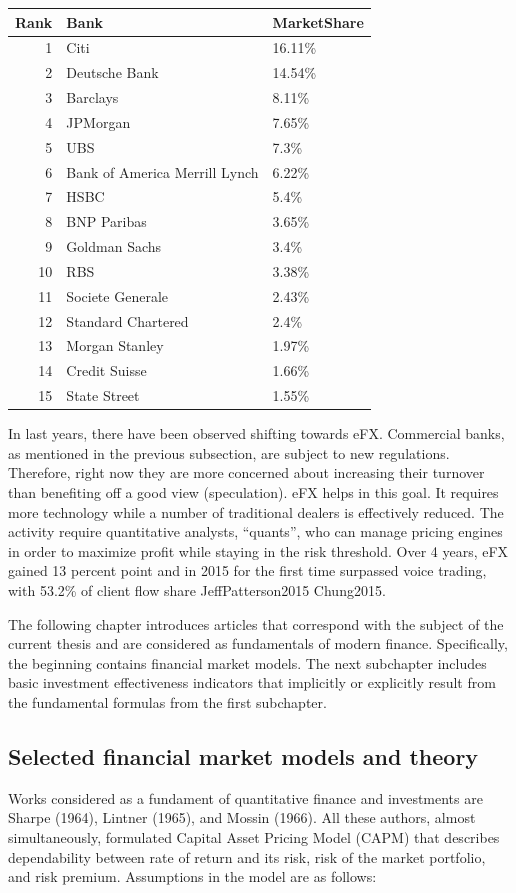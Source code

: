 \documentclass[]{article}
\begin{document}
\begin{longtable}[]{@{}rll@{}}
\toprule
Rank & Bank & MarketShare\tabularnewline
\midrule
\endhead
1 & Citi & 16.11\%\tabularnewline
2 & Deutsche Bank & 14.54\%\tabularnewline
3 & Barclays & 8.11\%\tabularnewline
4 & JPMorgan & 7.65\%\tabularnewline
5 & UBS & 7.3\%\tabularnewline
6 & Bank of America Merrill Lynch & 6.22\%\tabularnewline
7 & HSBC & 5.4\%\tabularnewline
8 & BNP Paribas & 3.65\%\tabularnewline
9 & Goldman Sachs & 3.4\%\tabularnewline
10 & RBS & 3.38\%\tabularnewline
11 & Societe Generale & 2.43\%\tabularnewline
12 & Standard Chartered & 2.4\%\tabularnewline
13 & Morgan Stanley & 1.97\%\tabularnewline
14 & Credit Suisse & 1.66\%\tabularnewline
15 & State Street & 1.55\%\tabularnewline
\bottomrule
\end{longtable}

In last years, there have been observed shifting towards eFX. Commercial
banks, as mentioned in the previous subsection, are subject to new
regulations. Therefore, right now they are more concerned about
increasing their turnover than benefiting off a good view (speculation).
eFX helps in this goal. It requires more technology while a number of
traditional dealers is effectively reduced. The activity require
quantitative analysts, ``quants'', who can manage pricing engines in
order to maximize profit while staying in the risk threshold. Over 4
years, eFX gained 13 percent point and in 2015 for the first time
surpassed voice trading, with 53.2\% of client flow share
JeffPatterson2015 Chung2015.

The following chapter introduces articles that correspond with the
subject of the current thesis and are considered as fundamentals of
modern finance. Specifically, the beginning contains financial market
models. The next subchapter includes basic investment effectiveness
indicators that implicitly or explicitly result from the fundamental
formulas from the first subchapter.

\subsection{Selected financial market models and
theory}\label{selected-financial-market-models-and-theory}

Works considered as a fundament of quantitative finance and investments
are Sharpe (1964), Lintner (1965), and Mossin (1966). All these authors,
almost simultaneously, formulated Capital Asset Pricing Model (CAPM)
that describes dependability between rate of return and its risk, risk
of the market portfolio, and risk premium. Assumptions in the model are
as follows:
\end{document}
